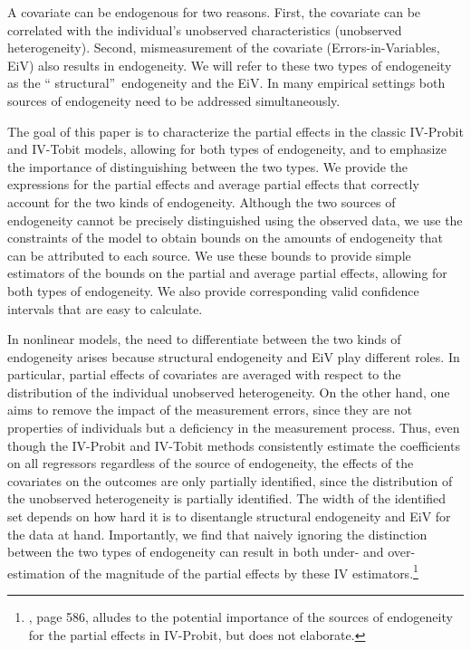 \documentclass[11pt]{article}
\begin{document}
A covariate can be endogenous for two reasons. First, the covariate can be
correlated with the individual's unobserved characteristics (unobserved
heterogeneity). Second, mismeasurement of the covariate
(Errors-in-Variables, EiV) also results in endogeneity. We will refer to
these two types of endogeneity as the \textquotedblleft
structural\textquotedblright\ endogeneity and the EiV. In many empirical
settings both sources of endogeneity need to be addressed simultaneously.

The goal of this paper is to characterize the partial effects in the classic
IV-Probit and IV-Tobit models, allowing for both types of endogeneity, and
to emphasize the importance of distinguishing between the two types. We
provide the expressions for the partial effects and average partial effects
that correctly account for the two kinds of endogeneity. Although the two
sources of endogeneity cannot be precisely distinguished using the observed
data, we use the constraints of the model to obtain bounds on the amounts of
endogeneity that can be attributed to each source. We use these bounds to
provide simple estimators of the bounds on the partial and average partial
effects, allowing for both types of endogeneity. We also provide
corresponding valid confidence intervals that are easy to calculate.

In nonlinear models, the need to differentiate between the two kinds of
endogeneity arises because structural endogeneity and EiV play different
roles. In particular, partial effects of covariates are averaged with
respect to the distribution of the individual unobserved heterogeneity. On
the other hand, one aims to remove the impact of the measurement errors,
since they are not properties of individuals but a deficiency in the
measurement process. Thus, even though the IV-Probit and IV-Tobit methods
consistently estimate the coefficients on all regressors regardless of the
source of endogeneity, the effects of the covariates on the outcomes are
only partially identified, since the distribution of the unobserved
heterogeneity is partially identified. The width of the identified set
depends on how hard it is to disentangle structural endogeneity and EiV for
the data at hand. Importantly, we find that naively ignoring the distinction
between the two types of endogeneity can result in both under- and
over-estimation of the magnitude of the partial effects by these IV
estimators.\footnote{\cite{Wooldridge2010Book}, page 586, alludes to the
potential importance of the sources of endogeneity for the partial effects
in IV-Probit, but does not elaborate.}
\end{document}
